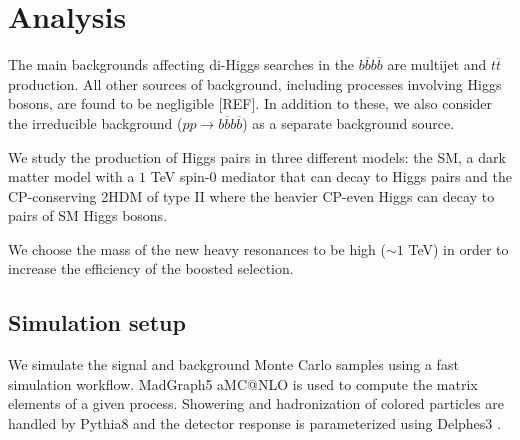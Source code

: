 
\section{Analysis}
\label{sec:imple}


The main backgrounds affecting di-Higgs searches in the $b\overline{b}b\overline{b}$ are multijet and $t\overline{t}$ production. All other sources of background, including processes involving Higgs bosons, are found to be negligible [REF]. In addition to these, we also consider the irreducible background ($pp\rightarrow b\overline{b}b\overline{b}$) as a separate background source.

We study the production of Higgs pairs in three different models: the SM, a dark matter model with a $1$ TeV spin-$0$ mediator that can decay to Higgs pairs and the CP-conserving 2HDM of type II where the heavier CP-even Higgs can decay to pairs of SM Higgs bosons.

We choose the mass of the new heavy resonances to be high ($\sim 1$ TeV) in order to increase the efficiency of the boosted selection.

\subsection{Simulation setup}
\label{sec:sim}

We simulate the signal and background Monte Carlo samples using a fast simulation workflow. MadGraph5 aMC@NLO \cite{MG5} is used to compute the matrix elements of a given process. Showering and hadronization of colored particles are handled by Pythia8 \cite{Pythia8} and the detector response is parameterized using Delphes3 \cite{Delphes}. 

